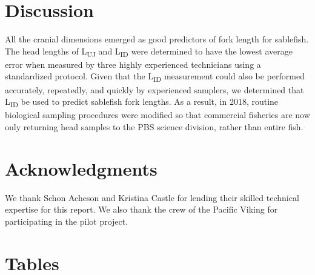 \documentclass[12pt]{article}\usepackage[]{graphicx}\usepackage[]{color}
\begin{document}
\hypertarget{discussion}{%
\section{Discussion}\label{discussion}}

All the cranial dimensions emerged as good predictors of fork length for sablefish. The head lengths of L\textsubscript{UJ} and L\textsubscript{ID} were determined to have the lowest average error when measured by three highly experienced technicians using a standardized protocol. Given that the L\textsubscript{ID} measurement could also be performed accurately, repeatedly, and quickly by experienced samplers, we determined that L\textsubscript{ID} be used to predict sablefish fork lengths. As a result, in 2018, routine biological sampling procedures were modified so that commercial fisheries are now only returning head samples to the PBS science division, rather than entire fish.

\hypertarget{acknowledgments}{%
\section{Acknowledgments}\label{acknowledgments}}

We thank Schon Acheson and Kristina Castle for lending their skilled technical expertise for this report. We also thank the crew of the Pacific Viking for participating in the pilot project.

\clearpage

\hypertarget{tables}{%
\section{Tables}\label{tables}}
\end{document}
